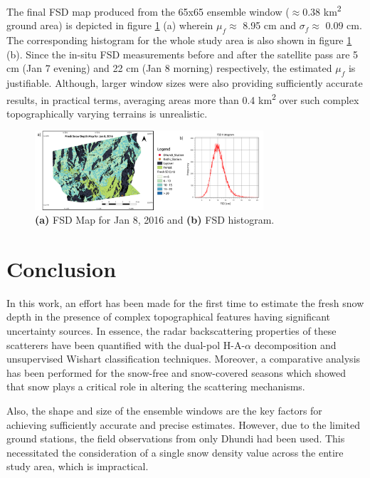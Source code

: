 \documentclass{article}
\begin{document}
The final FSD map produced from the 65x65 ensemble window ($\approx$0.38 km\textsuperscript{2} ground area) is depicted in figure \ref{fig:fsd_map} (a) wherein $\mu_f \approx$ 8.95 cm and $\sigma_f \approx$ 0.09 cm. The corresponding histogram for the whole study area is also shown in figure \ref{fig:fsd_map} (b). Since the in-situ FSD measurements before and after the satellite pass are 5 cm (Jan 7 evening) and 22 cm (Jan 8 morning) respectively, the estimated $\mu_f$ is justifiable. Although, larger window sizes were also providing sufficiently accurate results, in practical terms, averaging areas more than 0.4 km\textsuperscript{2} over such complex topographically varying terrains is unrealistic.
\begin{figure}[htb]
\centering
\includegraphics[width=8.5cm]{Pictures/FSD_Map.png}
\vspace{-2ex}
\caption{\textbf{(a)} FSD Map for Jan 8, 2016 and \textbf{(b)} FSD histogram.}
\label{fig:fsd_map}
\end{figure}

\section{Conclusion}
\label{sec:concl}
In this work, an effort has been made for the first time to estimate the fresh snow depth in the presence of complex topographical features having significant uncertainty sources. In essence, the radar backscattering properties of these scatterers have been quantified with the dual-pol H-A-$\alpha$ decomposition and unsupervised Wishart classification techniques. Moreover, a comparative analysis has been performed for the snow-free and snow-covered seasons which showed that snow plays a critical role in altering the scattering mechanisms. 

Also, the shape and size of the ensemble windows are the key factors for achieving sufficiently accurate and precise estimates. However, due to the limited ground stations, the field observations from only Dhundi had been used. This necessitated the consideration of a single snow density value across the entire study area, which is impractical.
\end{document}
